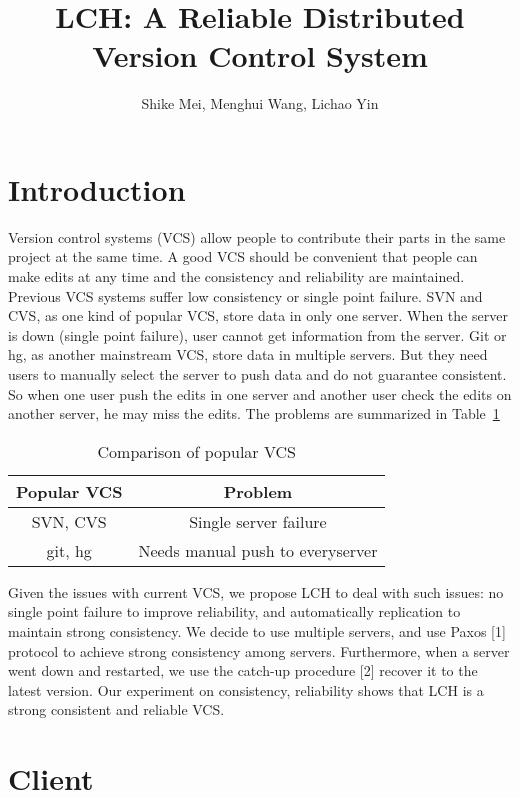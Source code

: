 \documentclass[11pt]{article}
\title{LCH: A Reliable Distributed Version Control System}
\author{Shike Mei, Menghui Wang, Lichao Yin}
\begin{document}
\maketitle
\section{Introduction}

Version control systems (VCS) allow people to contribute their parts in the same project at the same time. A good VCS should be convenient that people can make edits at any time and the consistency and reliability are maintained. Previous VCS systems suffer low consistency or single point failure. SVN and CVS, as one kind of popular VCS, store data in only one server. When the server is down (single point failure), user cannot get information from the server. Git or hg, as another mainstream VCS, store data in multiple servers. But they need users to manually select the server to push data and do not guarantee consistent. So when one user push the edits in one server and another user check the edits on another server, he may miss the edits. The problems are summarized in Table~\ref{table:problems}

\begin{table}
    \centering
\begin{tabular}{|c|c|}
  \hline
  Popular VCS & Problem  \\ \hline
  SVN, CVS & Single server failure \\
  git, hg & Needs manual push to everyserver \\
  \hline
\end{tabular}
\caption{Comparison of popular VCS}
\label{table:problems}
\end{table}

Given the issues with current VCS, we propose LCH to deal with such issues: no single point failure to improve reliability, and automatically replication to maintain strong consistency. We decide to use multiple servers, and use Paxos [1] protocol to achieve strong consistency among servers. Furthermore, when a server went down and restarted, we use the catch-up procedure [2] recover it to the latest version. Our experiment on consistency, reliability shows that LCH is a strong consistent and reliable VCS.

\section{Client}
\end{document}
